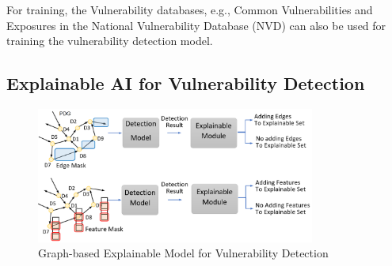 
For training, the Vulnerability databases, e.g., Common
Vulnerabilities and Exposures in the National Vulnerability Database
(NVD) can also be used for training the vulnerability detection model.


\subsection{Explainable AI for Vulnerability Detection}
\label{sec:xai}


\begin{figure}
	\centering
	\includegraphics[width=3.6in]{xai-example.png}
	\caption{Graph-based Explainable Model for Vulnerability Detection}
	\label{fig:xai}
\end{figure}

